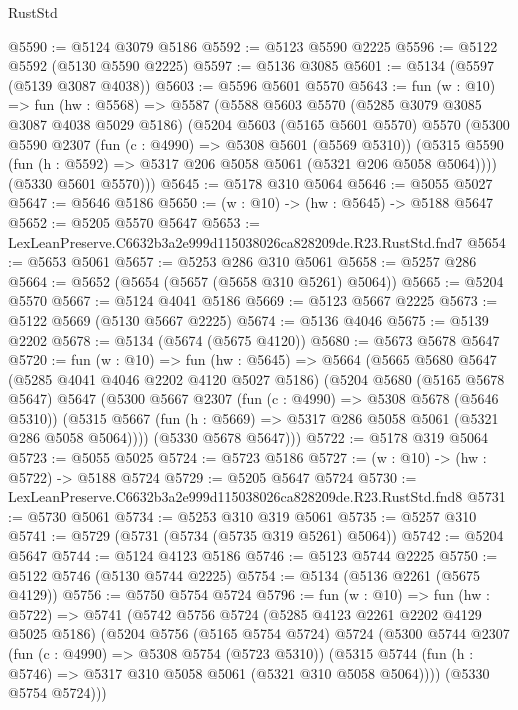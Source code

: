 \begin{lexlean}{RustStd}
\begin{coremodule}
@5590 := @5124 @3079 @5186
@5592 := @5123 @5590 @2225
@5596 := @5122 @5592 (@5130 @5590 @2225)
@5597 := @5136 @3085
@5601 := @5134 (@5597 (@5139 @3087 @4038))
@5603 := @5596 @5601 @5570
@5643 := fun (w : @10) =>
  fun (hw : @5568) =>
  @5587
    (@5588
      @5603
      @5570
      (@5285 @3079 @3085 @3087 @4038 @5029 @5186)
      (@5204
        @5603
        (@5165 @5601 @5570)
        @5570
        (@5300
          @5590
          @2307
          (fun (c : @4990) => @5308 @5601 (@5569 @5310))
          (@5315 @5590 (fun (h : @5592) => @5317 @206 @5058 @5061 (@5321 @206 @5058 @5064))))
        (@5330 @5601 @5570)))
@5645 := @5178 @310 @5064
@5646 := @5055 @5027
@5647 := @5646 @5186
@5650 := (w : @10) -> (hw : @5645) -> @5188 @5647
@5652 := @5205 @5570 @5647
@5653 := LexLeanPreserve.C6632b3a2e999d115038026ca828209de.R23.RustStd.fnd7
@5654 := @5653 @5061
@5657 := @5253 @286 @310 @5061
@5658 := @5257 @286
@5664 := @5652 (@5654 (@5657 (@5658 @310 @5261) @5064))
@5665 := @5204 @5570
@5667 := @5124 @4041 @5186
@5669 := @5123 @5667 @2225
@5673 := @5122 @5669 (@5130 @5667 @2225)
@5674 := @5136 @4046
@5675 := @5139 @2202
@5678 := @5134 (@5674 (@5675 @4120))
@5680 := @5673 @5678 @5647
@5720 := fun (w : @10) =>
  fun (hw : @5645) =>
  @5664
    (@5665
      @5680
      @5647
      (@5285 @4041 @4046 @2202 @4120 @5027 @5186)
      (@5204
        @5680
        (@5165 @5678 @5647)
        @5647
        (@5300
          @5667
          @2307
          (fun (c : @4990) => @5308 @5678 (@5646 @5310))
          (@5315 @5667 (fun (h : @5669) => @5317 @286 @5058 @5061 (@5321 @286 @5058 @5064))))
        (@5330 @5678 @5647)))
@5722 := @5178 @319 @5064
@5723 := @5055 @5025
@5724 := @5723 @5186
@5727 := (w : @10) -> (hw : @5722) -> @5188 @5724
@5729 := @5205 @5647 @5724
@5730 := LexLeanPreserve.C6632b3a2e999d115038026ca828209de.R23.RustStd.fnd8
@5731 := @5730 @5061
@5734 := @5253 @310 @319 @5061
@5735 := @5257 @310
@5741 := @5729 (@5731 (@5734 (@5735 @319 @5261) @5064))
@5742 := @5204 @5647
@5744 := @5124 @4123 @5186
@5746 := @5123 @5744 @2225
@5750 := @5122 @5746 (@5130 @5744 @2225)
@5754 := @5134 (@5136 @2261 (@5675 @4129))
@5756 := @5750 @5754 @5724
@5796 := fun (w : @10) =>
  fun (hw : @5722) =>
  @5741
    (@5742
      @5756
      @5724
      (@5285 @4123 @2261 @2202 @4129 @5025 @5186)
      (@5204
        @5756
        (@5165 @5754 @5724)
        @5724
        (@5300
          @5744
          @2307
          (fun (c : @4990) => @5308 @5754 (@5723 @5310))
          (@5315 @5744 (fun (h : @5746) => @5317 @310 @5058 @5061 (@5321 @310 @5058 @5064))))
        (@5330 @5754 @5724)))

\end{coremodule}
\end{lexlean}
